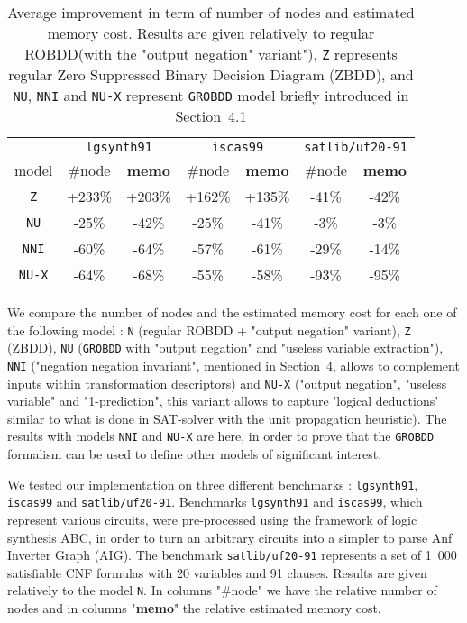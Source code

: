 \documentclass[a4paper,10pt]{article}
\newcommand{\GroBdd}{\texttt{GROBDD}}
\begin{document}
\begin{table}
\center
\begin{tabular}{c | c | c | c | c | c | c }
& \multicolumn{2}{c|}{\texttt{lgsynth91}} & \multicolumn{2}{c|}{\texttt{iscas99}} & \multicolumn{2}{c}{\texttt{satlib/uf20-91}} \\
model         & \#node & \textbf{memo} & \#node & \textbf{memo} & \#node & \textbf{memo} \\
\texttt{Z}    & +233\% & +203\%        & +162\% & +135\%        & -41\%  & -42\%         \\
\texttt{NU}   & -25\%  & -42\%         & -25\%  & -41\%         & -3\%   & -3\%          \\
\texttt{NNI}  & -60\%  & -64\%         & -57\%  & -61\%         & -29\%  & -14\%         \\
\texttt{NU-X} & -64\%  & -68\%         & -55\%  & -58\%         & -93\%  & -95\%         \\
\end{tabular}
\caption{Average improvement in term of number of nodes and estimated memory cost. Results are given relatively to regular ROBDD(with the "output negation" variant"), \texttt{Z} represents regular Zero Suppressed Binary Decision Diagram (ZBDD), and \texttt{NU}, \texttt{NNI} and \texttt{NU-X} represent \GroBdd{} model briefly introduced in Section~4.1}
\label{results}
\end{table}

We compare the number of nodes and the estimated memory cost for each one of the following model : \texttt{N} (regular ROBDD + "output negation" variant), \texttt{Z} (ZBDD), \texttt{NU} (\GroBdd{} with "output negation" and "useless variable extraction"), \texttt{NNI} ("negation negation invariant", mentioned in Section~4, allows to complement inputs within transformation descriptors) and \texttt{NU-X} ("output negation", "useless variable" and "1-prediction", this variant allows to capture 'logical deductions' similar to what is done in SAT-solver with the unit propagation heuristic).
The results with models \texttt{NNI} and \texttt{NU-X} are here, in order to prove that the \GroBdd{} formalism can be used to define other models of significant interest.

We tested our implementation on three different benchmarks : \texttt{lgsynth91}\cite{BenchLgsynth91}, \texttt{iscas99}\cite{BenchIscas99} and \texttt{satlib/uf20-91}\cite{BenchSatlib}.
Benchmarks \texttt{lgsynth91} and \texttt{iscas99}, which represent various circuits, were pre-processed using the framework of logic synthesis ABC\cite{Abc}, in order to turn an arbitrary circuits into a simpler to parse Anf Inverter Graph (AIG).
The benchmark \texttt{satlib/uf20-91} represents a set of 1~000 satisfiable CNF formulas with 20 variables and 91 clauses.
Results are given relatively to the model \texttt{N}.
In columns "\#node" we have the relative number of nodes and in columns "\textbf{memo}" the relative estimated memory cost.
\end{document}
